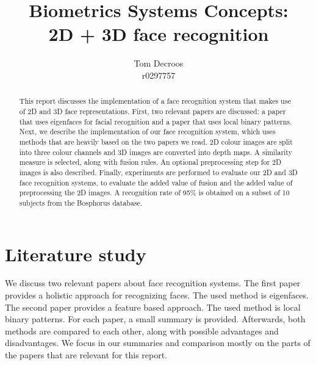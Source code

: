 \documentclass[]{article}
\title{Biometrics Systems Concepts:\\ 2D + 3D face recognition}
\author{Tom Decroos\\r0297757}
\begin{document}
\maketitle
\begin{abstract}
This report discusses the implementation of a face recognition system that makes use of 2D and 3D face representations. First, two relevant papers are discussed: a paper that uses eigenfaces for facial recognition and a paper that uses local binary patterns. Next, we describe the implementation of our face recognition system, which uses methods that are heavily based on the two papers we read. 2D colour images are split into three colour channels and 3D images are converted into depth maps. A similarity measure is selected, along with fusion rules. An optional preprocessing step for 2D images is also described. Finally, experiments are performed to evaluate our 2D and 3D face recognition systems, to evaluate the added value of fusion and the added value of preprocessing the 2D images. A recognition rate of 95\% is obtained on a subset of 10 subjects from the Bosphorus database. 

\end{abstract}

\section{Literature study}
We discuss two relevant papers about face recognition systems. The first paper provides a holistic approach for recognizing faces. The used method is eigenfaces. The second paper provides a feature based approach. The used method is local binary patterns.
For each paper, a small summary is provided. Afterwards, both methods are compared to each other, along with possible advantages and disadvantages. We focus in our summaries and comparison mostly on the parts of the papers that are relevant for this report.
\end{document}
